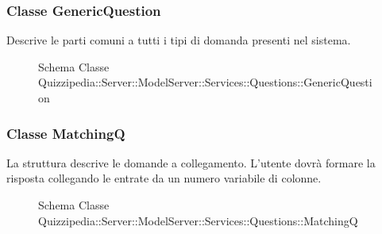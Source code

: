 \subsubsection{Classe GenericQuestion}
Descrive le parti comuni a tutti i tipi di domanda presenti nel sistema.
\begin{figure}[H]
\centering
\noindent{}
\caption[Schema Classe GenericQuestion]{Schema Classe Quizzipedia::Server::ModelServer::Services::Questions::GenericQuestion}
\end{figure}
\subsubsection{Classe MatchingQ}
La struttura descrive le domande a collegamento. L'utente dovrà formare la risposta collegando le entrate da un numero variabile di colonne.
\begin{figure}[H]
\centering
\noindent{}
\caption[Schema Classe MatchingQ]{Schema Classe Quizzipedia::Server::ModelServer::Services::Questions::MatchingQ}
\end{figure}
